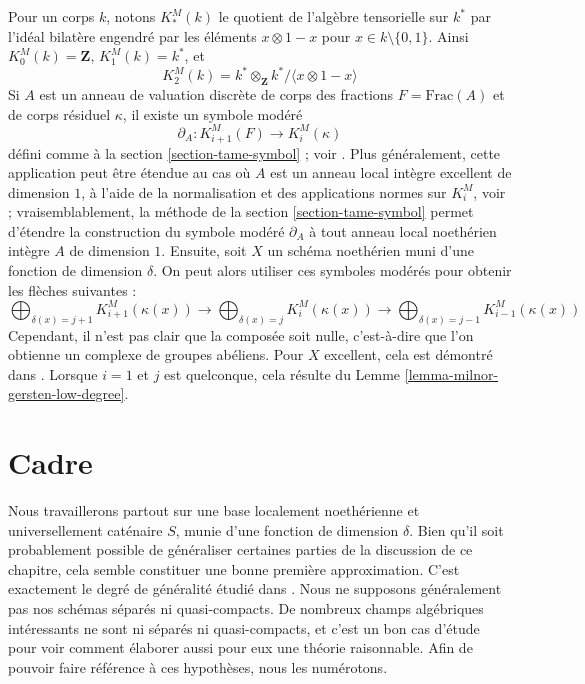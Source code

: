 \begin{remark}
\label{remark-gersten-complex-milnor}
Pour un corps $k$, notons $K^M_*(k)$ le quotient de
l'algèbre tensorielle sur $k^*$ par l'idéal bilatère
engendré par les éléments $x \otimes 1 - x$ pour $x \in k \setminus \{0, 1\}$.
Ainsi $K^M_0(k) = \mathbf{Z}$, $K_1^M(k) = k^*$, et
$$
K^M_2(k) = k^* \otimes_\mathbf{Z} k^* / \langle x \otimes 1 - x \rangle
$$
Si $A$ est un anneau de valuation discrète de corps des fractions $F = \text{Frac}(A)$
et de corps résiduel $\kappa$, il existe un symbole modéré
$$
\partial_A : K_{i + 1}^M(F) \to K_i^M(\kappa)
$$
défini comme à la section \ref{section-tame-symbol} ; voir \cite{Kato-Milnor-K}.
Plus généralement, cette application peut être étendue au cas où $A$ est un
anneau local intègre excellent de dimension $1$, à l'aide de la normalisation et des applications
normes sur $K_i^M$, voir \cite{Kato-Milnor-K} ; vraisemblablement, la méthode de la
section \ref{section-tame-symbol} permet d'étendre la construction
du symbole modéré $\partial_A$ à tout anneau local noethérien intègre $A$
de dimension $1$. Ensuite, soit $X$ un schéma noethérien muni d'une
fonction de dimension $\delta$. On peut alors utiliser ces symboles modérés pour obtenir
les flèches suivantes :
$$
\bigoplus\nolimits_{\delta(x) = j + 1} K^M_{i + 1}(\kappa(x))
\longrightarrow
\bigoplus\nolimits_{\delta(x) = j} K^M_i(\kappa(x))
\longrightarrow
\bigoplus\nolimits_{\delta(x) = j - 1} K^M_{i - 1}(\kappa(x))
$$
Cependant, il n'est pas clair que la composée soit nulle, c'est-à-dire que
l'on obtienne un complexe de groupes abéliens.
Pour $X$ excellent, cela est démontré dans \cite{Kato-Milnor-K}.
Lorsque $i = 1$ et $j$ est quelconque, cela résulte du
Lemme \ref{lemma-milnor-gersten-low-degree}.
\end{remark}





















\section{Cadre}
\label{section-setup}

\noindent
Nous travaillerons partout sur une base localement noethérienne et universellement
caténaire $S$, munie d'une fonction de dimension $\delta$.
Bien qu'il soit probablement possible de généraliser certaines parties de la
discussion de ce chapitre, cela semble constituer une bonne première
approximation. C'est exactement le degré de généralité étudié dans \cite{Thorup}.
Nous ne supposons généralement pas nos schémas
séparés ni quasi-compacts. De nombreux champs algébriques intéressants
ne sont ni séparés ni quasi-compacts, et c'est un bon
cas d'étude pour voir comment élaborer aussi pour eux une théorie raisonnable.
Afin de pouvoir faire référence à ces hypothèses, nous les numérotons.

